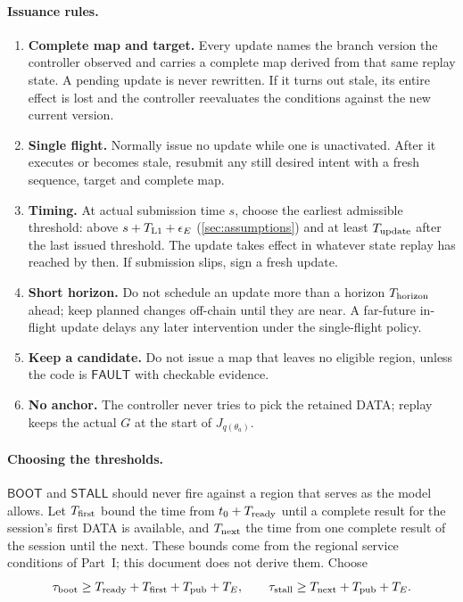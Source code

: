 \documentclass[11pt,a4paper]{article}
\newcommand{\tagg}[1]{\ensuremath{\mathsf{#1}}}
\begin{document}
\paragraph{Issuance rules.}
\begin{enumerate}[label=(R\arabic*)]
\item \textbf{Complete map and target.} Every update names the branch
version the controller observed and carries a complete map derived from
that same replay state. A pending update is never rewritten. If it turns
out stale, its entire effect is lost and the controller reevaluates the
conditions against the new current version.
\item \textbf{Single flight.} Normally issue no update while one is
unactivated. After it executes or becomes stale, resubmit any still
desired intent with a fresh sequence, target and complete map.
\item \textbf{Timing.} At actual submission time $s$, choose the
earliest admissible threshold: above $s+T_{\rm L1}+\epsilon_E$
(\cref{sec:assumptions}) and at least $T_{\rm update}$ after the last
issued threshold. The update takes effect in whatever state replay has
reached by then. If submission slips, sign a fresh update.
\item \textbf{Short horizon.} Do not schedule an update more than a
horizon $T_{\rm horizon}$ ahead; keep planned changes off-chain until they are near.
A far-future in-flight update delays any later intervention under the
single-flight policy.
\item \textbf{Keep a candidate.} Do not issue a map that leaves no
eligible region, unless the code is \tagg{FAULT} with checkable
evidence.
\item \textbf{No anchor.} The controller never tries to pick the
retained DATA; replay keeps the actual $G$ at the start of
$J_{q(\theta_a)}$.
\end{enumerate}

\paragraph{Choosing the thresholds.}
\tagg{BOOT} and \tagg{STALL} should never fire against a region that
serves as the model allows. Let $T_{\rm first}$ bound the time from
$t_0+T_{\rm ready}$ until a complete result for the session's first DATA
is available, and $T_{\rm next}$ the time from one complete result of
the session until the next. These bounds come from the regional service
conditions of Part~I; this document does not derive them. Choose
\[
 \tau_{\rm boot}\ge T_{\rm ready}+T_{\rm first}+T_{\rm pub}+T_E,
 \qquad
 \tau_{\rm stall}\ge T_{\rm next}+T_{\rm pub}+T_E.
\]
\end{document}

